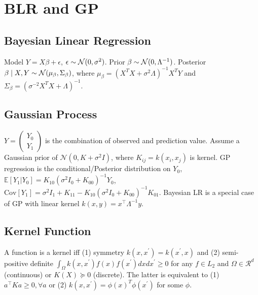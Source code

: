 \section{BLR and GP}

\subsection*{Bayesian Linear Regression}
Model $Y=X\beta+\epsilon$, $\epsilon\sim \mathcal{N}(0, \sigma^2)$. Prior $\beta \sim \mathcal{N}(0, \Lambda^{-1})$. Posterior $\beta \mid X, Y \sim \mathcal{N}(\mu_\beta, \Sigma_\beta)$, where $\mu_\beta = (X^T X+\sigma^2\Lambda)^{-1}X^T Y$ and $\Sigma_\beta =  (\sigma^{-2}X^T X+\Lambda)^{-1}$.  



\subsection*{Gaussian Process}
$Y = \left(\begin{matrix} Y_0 \\ Y_1 \end{matrix}\right)$ is the combination of observed and prediction value. Assume a Gaussian prior of $\mathcal{N}(0, K + \sigma^2 I)$, where $K_{ij}=k(x_i,x_j)$ is kernel. GP regression is the conditional/Posterior distribution on $Y_0$, $\mathbb{E} [Y_1|Y_0] = K_{1 0}(\sigma^{2} I_{0}+K_{00})^{-1}Y_0$, $\mathrm{Cov}[Y_1] = \sigma^{2}I_{1} + K_{11} - K_{10} (\sigma^2  I_{0} + K_{00})^{-1} K_{01}$. Bayesian LR is a special case of GP with linear kernel $k(x,y) = x^{\top}\Lambda^{-1}y$.

\subsection*{Kernel Function}
A function is a kernel iff (1) symmetry $k(x, x^\prime)=k(x^\prime, x)$ and (2) semi-positive definite $\int_\Omega k(x, x^\prime) f(x) f(x^\prime) dx dx^\prime \ge 0$ for any $f \in L_2$ and $\Omega \in \mathcal{R}^d$ (continuous) or $K(X)\succeq 0$ (discrete). The latter is equivalent to (1) $a^{\top} K a \geq 0, \forall a$ or (2) $k(x, x^\prime) = \phi(x)^T \phi(x^\prime)$ for some $\phi$.

